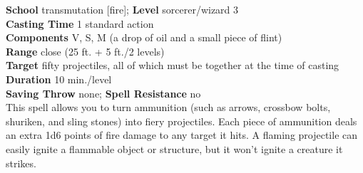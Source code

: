 \textbf{School} transmutation [fire]; \textbf{Level} sorcerer/wizard 3\\
\textbf{Casting Time} 1 standard action\\
\textbf{Components} V, S, M (a drop of oil and a small piece of flint)\\
\textbf{Range} close (25 ft. + 5 ft./2 levels)\\
\textbf{Target} fifty projectiles, all of which must be together at the time of casting\\
\textbf{Duration} 10 min./level\\
\textbf{Saving Throw} none; \textbf{Spell Resistance} no\\
This spell allows you to turn ammunition (such as arrows, crossbow bolts, shuriken, and sling stones) into fiery projectiles. Each piece of ammunition deals an extra 1d6 points of fire damage to any target it hits. A flaming projectile can easily ignite a flammable object or structure, but it won't ignite a creature it strikes.\\

